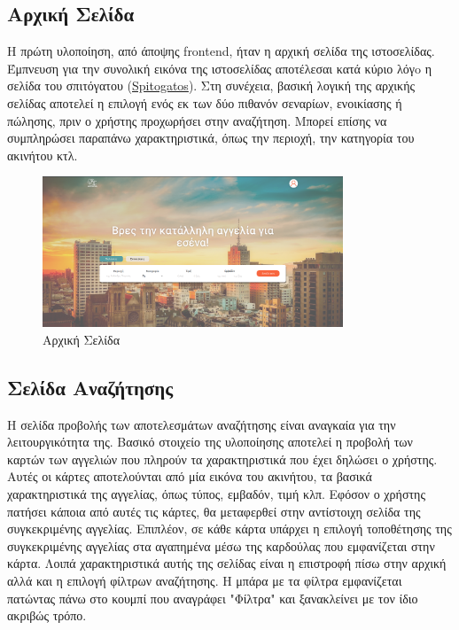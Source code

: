 \documentclass[manuscript,screen,review, language=greek, language=english]{acmart}
\begin{document}
\subsection{Αρχική Σελίδα}
	Η πρώτη υλοποίηση, από άποψης frontend, ήταν η αρχική σελίδα της ιστοσελίδας.
	Έμπνευση για την συνολική εικόνα της ιστοσελίδας αποτέλεσαι κατά κύριο λόγo η σελίδα
	του σπιτόγατου (\href{www.spitogatos.gr}{Spitogatos}).
	Στη συνέχεια, βασική λογική της αρχικής σελίδας αποτελεί η επιλογή ενός εκ των δύο
	πιθανόν σεναρίων, ενοικίασης ή πώλησης, πριν ο χρήστης προχωρήσει στην
	αναζήτηση. Μπορεί επίσης να συμπληρώσει παραπάνω χαρακτηριστικά, όπως την περιοχή,
	την κατηγορία του ακινήτου κτλ.

	\begin{figure}[H]
		   \includegraphics[width=0.8\textwidth]{home_page.png}
		   \caption{Αρχική Σελίδα}
		   \label{fig:home}
	\end{figure}

\subsection{Σελίδα Αναζήτησης}
	Η σελίδα προβολής των αποτελεσμάτων αναζήτησης είναι αναγκαία για την
	λειτουργικότητα της. Βασικό στοιχείο της υλοποίησης αποτελεί η προβολή των καρτών των
	αγγελιών που πληρούν τα χαρακτηριστικά που έχει δηλώσει ο χρήστης. Αυτές οι κάρτες
	αποτελούνται από μία εικόνα του ακινήτου, τα βασικά χαρακτηριστικά της αγγελίας,
	όπως τύπος, εμβαδόν, τιμή κλπ. Εφόσον ο χρήστης πατήσει κάποια από αυτές τις κάρτες,
	θα μεταφερθεί στην αντίστοιχη σελίδα της συγκεκριμένης αγγελίας. Επιπλέον, σε κάθε
	κάρτα υπάρχει η επιλογή τοποθέτησης της συγκεκριμένης αγγελίας στα αγαπημένα μέσω της
	καρδούλας που εμφανίζεται στην κάρτα. Λοιπά χαρακτηριστικά αυτής της σελίδας είναι η
	επιστροφή πίσω στην αρχική
	αλλά και η επιλογή φίλτρων αναζήτησης. Η μπάρα με τα φίλτρα εμφανίζεται πατώντας πάνω
	στο κουμπί που αναγράφει "Φίλτρα" και ξανακλείνει με τον ίδιο ακριβώς τρόπο.
\end{document}
